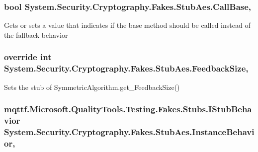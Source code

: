 \hypertarget{class_system_1_1_security_1_1_cryptography_1_1_fakes_1_1_stub_aes_a95116b3381e252b35681804aab2c502b}{
\subsubsection[{Call\-Base}]{\setlength{\rightskip}{0pt plus 5cm}bool System.\-Security.\-Cryptography.\-Fakes.\-Stub\-Aes.\-Call\-Base\hspace{0.3cm}{\ttfamily [get]}, {\ttfamily [set]}}}\label{class_system_1_1_security_1_1_cryptography_1_1_fakes_1_1_stub_aes_a95116b3381e252b35681804aab2c502b}


Gets or sets a value that indicates if the base method should be called instead of the fallback behavior

\hypertarget{class_system_1_1_security_1_1_cryptography_1_1_fakes_1_1_stub_aes_a2b352de11bd0423d1a4035acb75e5a7a}{
\subsubsection[{Feedback\-Size}]{\setlength{\rightskip}{0pt plus 5cm}override int System.\-Security.\-Cryptography.\-Fakes.\-Stub\-Aes.\-Feedback\-Size\hspace{0.3cm}{\ttfamily [get]}, {\ttfamily [set]}}}\label{class_system_1_1_security_1_1_cryptography_1_1_fakes_1_1_stub_aes_a2b352de11bd0423d1a4035acb75e5a7a}


Sets the stub of Symmetric\-Algorithm.\-get\-\_\-\-Feedback\-Size()

\hypertarget{class_system_1_1_security_1_1_cryptography_1_1_fakes_1_1_stub_aes_a15acad4dce974b7a44596912f8300ab8}{
\subsubsection[{Instance\-Behavior}]{\setlength{\rightskip}{0pt plus 5cm}mqttf.\-Microsoft.\-Quality\-Tools.\-Testing.\-Fakes.\-Stubs.\-I\-Stub\-Behavior System.\-Security.\-Cryptography.\-Fakes.\-Stub\-Aes.\-Instance\-Behavior\hspace{0.3cm}{\ttfamily [get]}, {\ttfamily [set]}}}\label{class_system_1_1_security_1_1_cryptography_1_1_fakes_1_1_stub_aes_a15acad4dce974b7a44596912f8300ab8}


